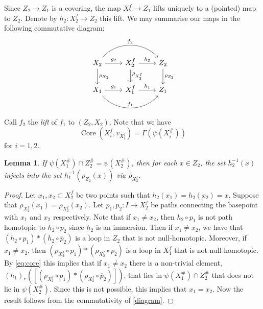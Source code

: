 \documentclass[11pt, a4paper]{amsart}
\newtheorem{lemma}[theorem]{Lemma}
\theoremstyle{definition}
\DeclareMathOperator{\core}{Core}
\begin{document}
Since $Z_2\to Z_1$ is a covering, the map $X_2^f\to Z_1$ lifts uniquely to a (pointed) map to $Z_2$. Denote by $h_2\colon X_2^f\to Z_2$ this lift. We may summarise our maps in the following commutative diagram:
\begin{equation}
\label{diagram}
\begin{tikzcd}
X_2 \arrow[r, "g_2"] \arrow[d, "\rho_{X_2}"] \arrow[rr, "f_2", bend left=49] & X_2^f \arrow[d, "\rho_{X_2^f}"] \arrow[r, "h_2"] & Z_2 \arrow[d, "\rho_{Z_2}"] \\
X_1 \arrow[r, "g_1"] \arrow[rr, "f_1", bend right=49]                        & X_1^f \arrow[r, "h_1"]                           & Z_1                        
\end{tikzcd}
\end{equation}
Call $f_2$ the \emph{lift} of $f_1$ to $(Z_2, X_2)$. Note that we have
\begin{equation}
\label{eq:core}
\core\left(X_i^f, v_{X_i^f}\right) = \Gamma(\psi(X^{\#}_i))
\end{equation}
for $i = 1, 2$.

\begin{lemma}
\label{lem:preimage_bound1}
If $\psi(X^{\#}_1)\cap Z^{\#}_2= \psi(X^{\#}_2)$, then for each $x\in Z_2$, the set $h_2^{-1}(x)$ injects into the set $h_1^{-1}\left(\rho_{Z_2}(x)\right)$ via $\rho_{X_2^f}$.
\end{lemma}

\begin{proof}
Let $x_1, x_2\subset X_2^f$ be two points such that $h_2(x_1) = h_2(x_2) = x$. Suppose that $\rho_{X_2^f}(x_1) = \rho_{X_2^f}(x_2)$. Let $p_1, p_2\colon I\to X_2^f$ be paths connecting the basepoint with $x_1$ and $x_2$ respectively. Note that if $x_1\neq x_2$, then $h_2\circ p_1$ is not path homotopic to $h_2\circ p_2$ since $h_2$ is an immersion. Then if $x_1\neq x_2$, we have that $(h_2\circ p_1) * (h_2\circ \overline{p}_2)$ is a loop in $Z_2$ that is not null-homotopic. Moreover, if $x_1\neq x_2$, then $(\rho_{X_2^f}\circ p_1)*(\rho_{X_2^f}\circ \overline{p}_2)$ is a loop in $X_1^f$ that is not null-homotopic. By \eqref{eq:core} this implies that if $x_1\neq x_2$ there is a non-trivial element, $(h_1)_*([(\rho_{X_2^f}\circ p_1)*(\rho_{X_2^f}\circ \overline{p}_2)])$, that lies in $\psi(X^{\#}_1)\cap Z^{\#}_2$ that does not lie in $\psi(X^{\#}_2)$. Since this is not possible, this implies that $x_1 = x_2$. Now the result follows from the commutativity of \eqref{diagram}.
\end{proof}
\end{document}
